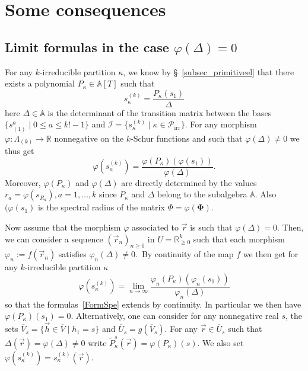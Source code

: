 \documentclass[ALCO,ThmDefs,Unicode,epreuves]{cedram}
\DeclareMathOperator{\irr}{irr}
\begin{document}
\section{Some consequences}\label{section7}

\subsection{Limit formulas in the case \texorpdfstring{$\varphi(\Delta)=0$}{varphi(Delta)=0}}

\label{SubsecLim}For any $k$-irreducible partition $\kappa$, we know by
\S~\ref{subsec_primitiveel} that there exists a polynomial $P_{\kappa}%
\in\mathbb{A}[T]$ such that
\begin{equation}
s_{\kappa}^{(k)}=\frac{P_{\kappa}(s_{1})}{\Delta} \label{FormPrim}%
\end{equation}
here $\Delta\in\mathbb{A}$ is the determinant of the transition matrix between
the bases $\{s_{(1)}^{a}\mid0\leq a\leq k!-1\}$ and $\mathcal{I}=\{s_{\kappa
}^{(k)}\mid\kappa\in\mathcal{P}_{\irr }\}$. For any morphism
$\varphi:\Lambda_{(k)}\rightarrow\mathbb{R}$ nonnegative on the $k$-Schur
functions and such that $\varphi(\Delta)\neq0$ we thus get%
\begin{equation}
\varphi(s_{\kappa}^{(k)})=\frac{\varphi(P_{\kappa})(\varphi(s_{1}))}%
{\varphi(\Delta)}. \label{FormSpe}%
\end{equation}
Moreover, $\varphi(P_{\kappa})$ and $\varphi(\Delta)$ are directly determined
by the values $r_{a}=\varphi(s_{R_{a}}),a=1,\ldots,k$ since $P_{\kappa}$ and
$\Delta$ belong to the subalgebra $\mathbb{A}$. Also $(\varphi(s_{1})$ is the
spectral radius of the matrix $\Phi=\varphi(\boldsymbol{\Phi})$.

Now assume that the morphism $\varphi$ associated to $\vec{r}$ is such that
$\varphi(\Delta)=0$. Then, we can consider a sequence $(\vec{r}_{n})_{n\geq0}$
in $U=\mathbb{R}_{\geq0}^{k}$ such that each morphism $\varphi_{n}:=f(\vec
{r}_{n})$ satisfies $\varphi_{n}(\Delta)\neq0$.\ By continuity of the map $f$
we then get for any $k$-irreducible partition $\kappa$%
\[
\varphi(s_{\kappa}^{(k)})=\lim_{n\rightarrow\infty}\frac{\varphi_{n}%
(P_{\kappa})(\varphi_{n}(s_{1}))}{\varphi_{n}(\Delta)}%
\]
so that the formulas~\eqref{FormSpe} extends by continuity. In particular we
then have $\varphi(P_{\kappa})(s_{1})=0$. Alternatively, one can consider for
any nonnegative real $s$, the sets $\overline{V}_{s}=\{\vec{h}\in\overline
{V}\mid h_{1}=s\}$ and $\overline{U}_{s}=g(\overline{V}_{s})$. For any
$\vec{r}\in\overline{U}_{s}$ such that $\Delta(\vec{r})=\varphi(\Delta)\neq0$
write $\widetilde{P}_{\kappa}^{s}(\vec{r})=\varphi(P_{\kappa})(s)$. We also
set $\varphi(s_{\kappa}^{(k)})=s_{\kappa}^{(k)}(\vec{r})$.
\end{document}
